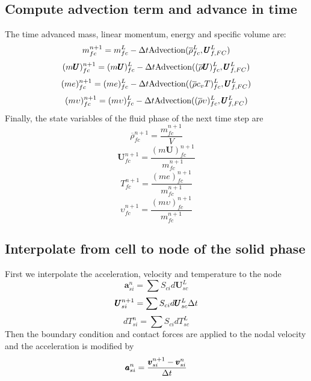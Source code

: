 \documentclass[preprint,12pt]{elsarticle}
\begin{document}
\subsection{\textsf{Compute advection term and advance in time}}
The time advanced mass, linear momentum, energy and specific volume are:
%
%
\begin{equation}
 m_{fc}^{n+1} = m_{fc}^L - \Delta{t} \text{Advection}(\overline{\rho}_{fc}^L,\pmb{U}_{f,FC}^{L})
\end{equation}
%
%
\begin{equation}
 (m \pmb{U})_{fc}^{n+1} = (m \pmb{U})_{fc}^L - \Delta{t} \text{Advection}((\overline{\rho} \pmb{U})_{fc}^L,\pmb{U}_{f,FC}^{L})
\end{equation}
%
%
\begin{equation}
 (me)_{fc}^{n+1} = (me)_{fc}^L - \Delta{t} \text{Advection}((\overline{\rho} c_v T)_{fc}^L,\pmb{U}_{f,FC}^{L})
\end{equation}
%
%
\begin{equation}
 (m \upsilon)_{fc}^{n+1} = (m \upsilon)_{fc}^L - \Delta{t} \text{Advection}((\overline{\rho} \upsilon)_{fc}^L,\pmb{U}_{f,FC}^{L})
\end{equation}
%
%
Finally, the state variables of the fluid phase of the next time step are
%
%
\begin{equation}
\overline{\rho}_{fc}^{n+1} = \frac{m_{fc}^{n+1}} {V}
\end{equation}
%
%
\begin{equation}
 \pmb{U}_{fc}^{n+1} = \frac{(m \pmb{U})_{fc}^{n+1}}{m_{fc}^{n+1}} 
\end{equation}
%
%
\begin{equation}
 T_{fc}^{n+1} = \frac{(me)_{fc}^{n+1}}{m_{fc}^{n+1}}
\end{equation}
%
%
\begin{equation}
 \upsilon_{fc}^{n+1} = \frac{(m \upsilon)_{fc}^{n+1}}{m_{fc}^{n+1}}
\end{equation}
%
%
\subsection{\textsf{Interpolate from cell to node of the solid phase}}
%
First we interpolate the acceleration, velocity and temperature to the node
%
%
\begin{equation}
 \pmb{a}_{si}^n = \sum{S_{ci} d\pmb{U}_{sc}^L}
\end{equation}
%
%
\begin{equation}
 \pmb{U}_{si}^{n+1} = \sum{S_{ci} d\pmb{U}_{sc}^L} \Delta{t}
\end{equation}
%
\begin{equation}
 dT_{si}^n =  \sum{S_{ci} dT_{sc}^L}
\end{equation}
%
%
Then the boundary condition and contact forces are applied to the nodal velocity and the acceleration is modified by
%
%
\begin{equation}
     \pmb{a}_{si}^n = \frac{\pmb{v}_{si}^{n+1} - \pmb{v}_{si}^n}{\Delta{t}}
\end{equation}
%
%
\end{document}
